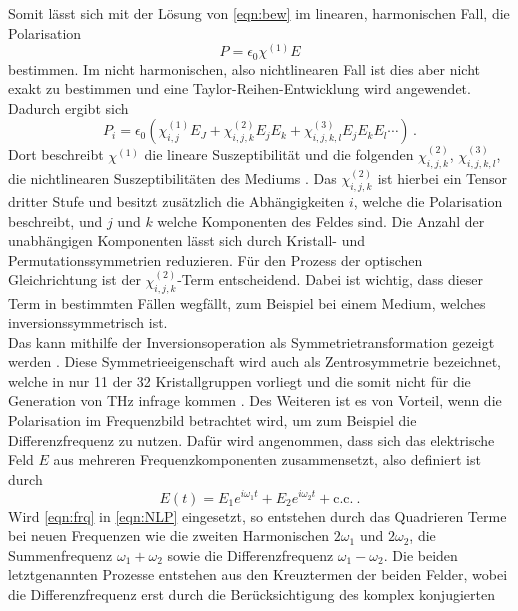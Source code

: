 Somit lässt sich mit der Lösung von \eqref{eqn:bew} im linearen, harmonischen Fall, die Polarisation 
\begin{equation}
    P =  \epsilon_0 \chi^{(1)}E  
\end{equation}
bestimmen.
Im nicht harmonischen, also nichtlinearen Fall ist dies aber nicht exakt zu bestimmen und 
eine Taylor-Reihen-Entwicklung wird angewendet. 
Dadurch ergibt sich
\begin{equation}
    \label{eqn:NLP}
    P_{i} = \epsilon_0 \left(\chi^{(1)}_{i,j}E_J+\chi^{(2)}_{i,j,k}E_j E_k+\chi^{(3)}_{i,j,k,l}E_j E_k E_l\dotsb\right)\, .
\end{equation}
Dort beschreibt $\chi^{(1)}$ die lineare Suszeptibilität und die folgenden $\chi^{(2)}_{i,j,k}$, $\chi^{(3)}_{i,j,k,l}$,
die nichtlinearen Suszeptibilitäten des Mediums \cite{Butcher_Cotter_1990}.
Das $\chi^{(2)}_{i,j,k}$ ist hierbei ein Tensor dritter Stufe und besitzt zusätzlich die Abhängigkeiten 
$i$, welche die Polarisation beschreibt, und $j$ und $k$ welche Komponenten des Feldes sind.
Die Anzahl der unabhängigen Komponenten lässt sich durch Kristall- und Permutationssymmetrien reduzieren.
Für den Prozess der optischen Gleichrichtung ist der $\chi^{(2)}_{i,j,k}$-Term entscheidend. 
Dabei ist wichtig, dass dieser Term in bestimmten Fällen wegfällt, 
zum Beispiel bei einem Medium, welches inversionssymmetrisch ist. \\
Das kann mithilfe der Inversionsoperation als Symmetrietransformation gezeigt werden \cite[Kap. 5.3.2]{Butcher_Cotter_1990}. 
Diese Symmetrieeigenschaft wird auch als Zentrosymmetrie bezeichnet, 
welche in nur 11 der 32 Kristallgruppen vorliegt und die somit nicht für die Generation von THz infrage kommen \cite{Jazbinsek2019}. 
Des Weiteren ist es von Vorteil, wenn die Polarisation im Frequenzbild betrachtet wird, um zum Beispiel die Differenzfrequenz zu nutzen. 
Dafür wird angenommen, dass sich das elektrische Feld $E$ aus mehreren Frequenzkomponenten 
zusammensetzt, also definiert ist durch
\begin{equation}
    \label{eqn:frq}
    E(t)=E_1e^{i\omega_1 t}+E_2e^{i\omega_2 t} + \text{c.c.}\ .
\end{equation}
Wird \eqref{eqn:frq} in \eqref{eqn:NLP} eingesetzt, so entstehen durch das Quadrieren
Terme bei neuen Frequenzen wie die zweiten Harmonischen $2\omega_1$ und $2\omega_2$, die
Summenfrequenz $\omega_1+\omega_2$ sowie die Differenzfrequenz $\omega_1-\omega_2$.
Die beiden letztgenannten Prozesse entstehen aus den Kreuztermen der beiden Felder,
wobei die Differenzfrequenz erst durch die Berücksichtigung des komplex konjugierten
